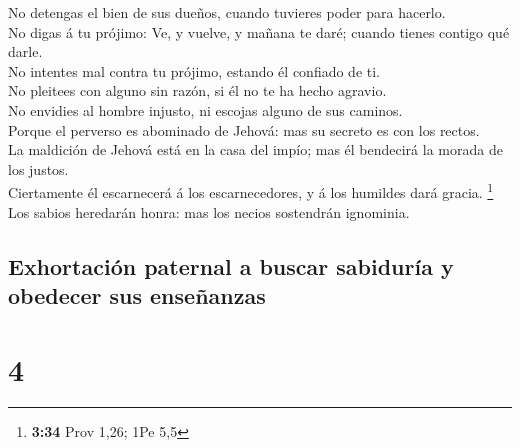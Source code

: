  No detengas el bien de sus dueños, cuando tuvieres poder
para hacerlo.\\
 No digas á tu prójimo: Ve, y vuelve, y mañana te daré;
cuando tienes contigo qué darle.\\
 No intentes mal contra tu prójimo, estando él confiado de
ti.\\
 No pleitees con alguno sin razón, si él no te ha hecho
agravio.\\
 No envidies al hombre injusto, ni escojas alguno de sus
caminos.\\
 Porque el perverso es abominado de Jehová: mas su secreto
es con los rectos.\\
 La maldición de Jehová está en la casa del impío; mas él
bendecirá la morada de los justos.\\
 Ciertamente él escarnecerá á los escarnecedores, y á los
humildes dará gracia. \footnote{\textbf{3:34} Prov 1,26; 1Pe 5,5}\\
 Los sabios heredarán honra: mas los necios sostendrán
ignominia.

\hypertarget{exhortaciuxf3n-paternal-a-buscar-sabiduruxeda-y-obedecer-sus-enseuxf1anzas}{%
\subsection{Exhortación paternal a buscar sabiduría y obedecer sus
enseñanzas}\label{exhortaciuxf3n-paternal-a-buscar-sabiduruxeda-y-obedecer-sus-enseuxf1anzas}}

\hypertarget{section-3}{%
\section{4}\label{section-3}}

